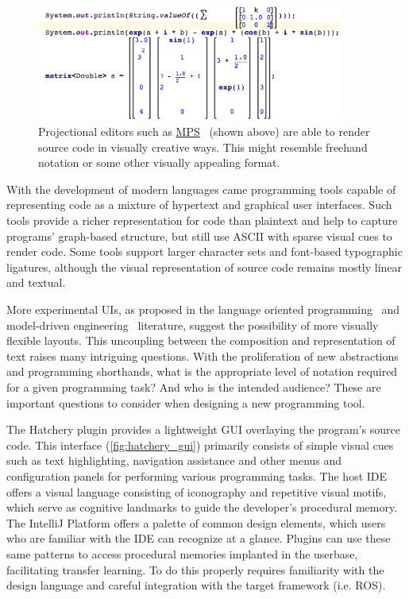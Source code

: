 \documentclass[12pt,initial,twoside,maitrise]{dms}
\numberwithin{equation}{section}
\numberwithin{table}{chapter}
\numberwithin{figure}{chapter}
\begin{document}
\begin{figure}
    \centering
    \includegraphics[width=0.90\textwidth]{../figures/mps_screenshot.png}
    \caption{Projectional editors such as \href{https://www.jetbrains.com/mps/}{MPS}~\citep{voelter2010language, pech2013jetbrains} (shown above) are able to render source code in visually creative ways. This might resemble freehand notation or some other visually appealing format.}
    \label{fig:mps_screenshot}
\end{figure}

With the development of modern languages came programming tools capable of representing code as a mixture of hypertext and graphical user interfaces. Such tools provide a richer representation for code than plaintext and help to capture programs' graph-based structure, but still use ASCII with sparse visual cues to render code. Some tools support larger character sets and font-based typographic ligatures, although the visual representation of source code remains mostly linear and textual.

More experimental UIs, as proposed in the language oriented programming~\citep{dmitriev2004language} and model-driven engineering~\citep{famelis2015mummint} literature, suggest the possibility of more visually flexible layouts. This uncoupling between the composition and representation of text raises many intriguing questions. With the proliferation of new abstractions and programming shorthands, what is the appropriate level of notation required for a given programming task? And who is the intended audience? These are important questions to consider when designing a new programming tool.

The Hatchery plugin provides a lightweight GUI overlaying the program's source code. This interface (\autoref{fig:hatchery_gui}) primarily consists of simple visual cues such as text highlighting, navigation assistance and other menus and configuration panels for performing various programming tasks. The host IDE offers a visual language consisting of iconography and repetitive visual motifs, which serve as cognitive landmarks to guide the developer's procedural memory. The IntelliJ Platform offers a palette of common design elements, which users who are familiar with the IDE can recognize at a glance. Plugins can use these same patterns to access procedural memories implanted in the userbase, facilitating transfer learning. To do this properly requires familiarity with the design language and careful integration with the target framework (i.e. ROS).
\end{document}
